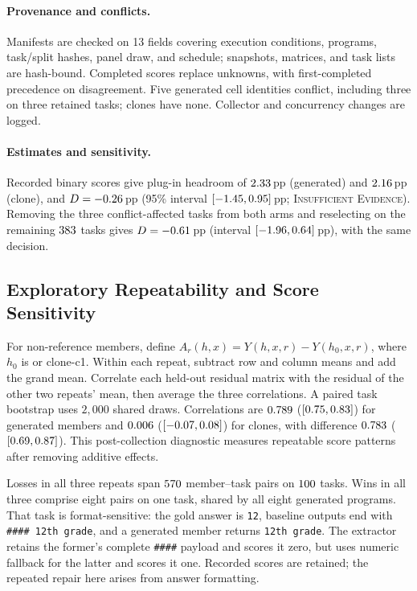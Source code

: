 \paragraph{Provenance and conflicts.}
Manifests are checked on 13 fields covering execution conditions,
programs, task/split hashes, panel draw, and schedule; snapshots,
matrices, and task lists are hash-bound. Completed scores replace
unknowns, with first-completed precedence on disagreement. Five
generated cell identities conflict, including three on three retained
tasks; clones have none. Collector and concurrency changes are logged.

\paragraph{Estimates and sensitivity.}
Recorded binary scores give plug-in headroom of $2.33$\,pp
(generated) and $2.16$\,pp (clone), and
$D=-0.26$\,pp (95\% interval $[-1.45, 0.95]$\,pp;
\textsc{Insufficient Evidence}). Removing the three conflict-affected
tasks from both arms and reselecting on the remaining $383$
tasks gives $D=-0.61$\,pp (interval $[-1.96, 0.64]$\,pp),
with the same decision.

\subsection{Exploratory Repeatability and Score Sensitivity}\label{app:repeatability}
For non-reference members, define $A_r(h,x)=Y(h,x,r)-Y(h_0,x,r)$,
where $h_0$ is \bare{} or clone-c1. Within each repeat, subtract row
and column means and add the grand mean. Correlate each held-out
residual matrix with the residual of the other two repeats' mean,
then average the three correlations. A paired task bootstrap uses
$2{,}000$ shared draws. Correlations are $0.789$
($[0.75, 0.83]$) for generated members and $0.006$
($[-0.07, 0.08]$) for clones, with difference $0.783$
($[0.69, 0.87]$). This post-collection diagnostic measures repeatable
score patterns after removing additive effects.

Losses in all three repeats span $570$ member--task pairs on
$100$ tasks. Wins in all three comprise eight pairs on one
task, shared by all eight generated programs. That task is
format-sensitive: the gold answer is \texttt{12}, baseline outputs end
with \texttt{\#\#\#\# 12th grade}, and a generated member returns
\texttt{12th grade}. The extractor retains the former's complete
\texttt{\#\#\#\#} payload and scores it zero, but uses numeric fallback
for the latter and scores it one. Recorded scores are retained; the
repeated repair here arises from answer formatting.
\FloatBarrier
